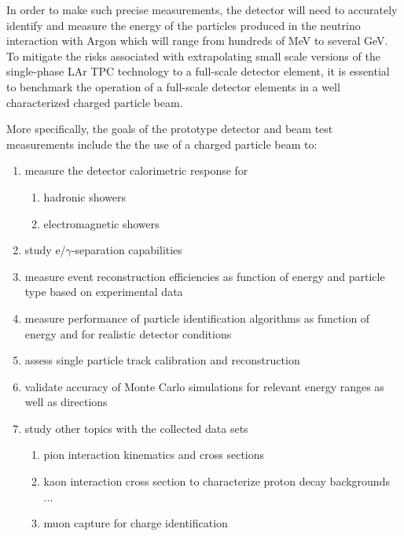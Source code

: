 In order to make such precise measurements, the detector will need to accurately identify and measure the energy of the particles produced in the neutrino interaction with Argon which will range from hundreds of MeV to several GeV.
To mitigate the risks associated with extrapolating small scale versions of the single-phase LAr TPC technology to a full-scale detector element, it is essential to benchmark the operation of a full-scale detector elements in a well characterized charged particle beam.  

More specifically, the goals of the prototype detector and beam test measurements include the
the use of a charged particle beam to:
\begin{enumerate}
\item measure the detector calorimetric response for
\begin{enumerate}
	\item hadronic showers
	\item electromagnetic showers
\end{enumerate}
\item study e/$\gamma$-separation capabilities
\item measure event reconstruction efficiencies as function of energy and particle type based on experimental data
\item measure performance of particle identification algorithms as function of energy and for realistic detector conditions
\item assess single particle track calibration and reconstruction
\item validate accuracy of Monte Carlo simulations for relevant energy ranges as well as directions

\item study other topics with the collected data sets
 \begin{enumerate}
    \item pion interaction kinematics and cross sections
    \item kaon interaction cross section to characterize proton decay backgrounds ...
    \item muon capture for charge identification
 \end{enumerate}
\end{enumerate}

